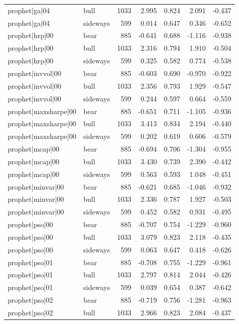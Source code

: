 \begin{table}
\begin{tabular}{llrrrrr}
prophet|ga|04 & bull & 1033 & 2.995 & 0.824 & 2.091 & -0.437 \\
prophet|ga|04 & sideways & 599 & 0.014 & 0.647 & 0.346 & -0.652 \\
prophet|hrp|00 & bear & 885 & -0.641 & 0.688 & -1.116 & -0.938 \\
prophet|hrp|00 & bull & 1033 & 2.316 & 0.794 & 1.910 & -0.504 \\
prophet|hrp|00 & sideways & 599 & 0.325 & 0.582 & 0.774 & -0.538 \\
prophet|invvol|00 & bear & 885 & -0.603 & 0.690 & -0.970 & -0.922 \\
prophet|invvol|00 & bull & 1033 & 2.356 & 0.793 & 1.929 & -0.547 \\
prophet|invvol|00 & sideways & 599 & 0.244 & 0.597 & 0.664 & -0.559 \\
prophet|maxsharpe|00 & bear & 885 & -0.651 & 0.711 & -1.105 & -0.936 \\
prophet|maxsharpe|00 & bull & 1033 & 3.413 & 0.834 & 2.194 & -0.440 \\
prophet|maxsharpe|00 & sideways & 599 & 0.202 & 0.619 & 0.606 & -0.579 \\
prophet|mcap|00 & bear & 885 & -0.694 & 0.706 & -1.304 & -0.955 \\
prophet|mcap|00 & bull & 1033 & 3.430 & 0.739 & 2.390 & -0.442 \\
prophet|mcap|00 & sideways & 599 & 0.563 & 0.593 & 1.048 & -0.451 \\
prophet|minvar|00 & bear & 885 & -0.621 & 0.685 & -1.046 & -0.932 \\
prophet|minvar|00 & bull & 1033 & 2.336 & 0.787 & 1.927 & -0.503 \\
prophet|minvar|00 & sideways & 599 & 0.452 & 0.582 & 0.931 & -0.495 \\
prophet|pso|00 & bear & 885 & -0.707 & 0.754 & -1.229 & -0.960 \\
prophet|pso|00 & bull & 1033 & 3.079 & 0.823 & 2.118 & -0.435 \\
prophet|pso|00 & sideways & 599 & 0.063 & 0.647 & 0.418 & -0.626 \\
prophet|pso|01 & bear & 885 & -0.708 & 0.755 & -1.229 & -0.961 \\
prophet|pso|01 & bull & 1033 & 2.797 & 0.814 & 2.044 & -0.426 \\
prophet|pso|01 & sideways & 599 & 0.039 & 0.654 & 0.387 & -0.642 \\
prophet|pso|02 & bear & 885 & -0.719 & 0.756 & -1.281 & -0.963 \\
prophet|pso|02 & bull & 1033 & 2.966 & 0.823 & 2.084 & -0.437 \\

\end{tabular}
\end{table}
